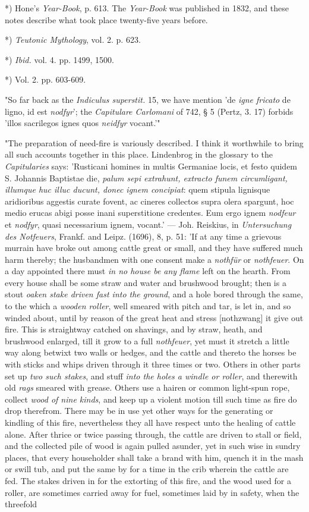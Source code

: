 \documentclass[a4paper, 11pt, oneside, polutonikogreek, english]{article}
\begin{document}
*) Hone's \emph{Year-Book}, p. 613. The \emph{Year-Book} was published in 1832, and these notes describe what took place twenty-five years before.

*) \emph{Teutonic Mythology}, vol. 2. p. 623.

*) \emph{Ibid.} vol. 4. pp. 1499, 1500.

*) Vol. 2. pp. 603-609.

"So far back as the \emph{Indiculus superstit.} 15, we have mention 'de \emph{igne fricato} de ligno, id est \emph{nodfyr}'; the \emph{Capitulare Carlomani} of 742, § 5 (Pertz, 3. 17) forbids 'illos sacrilegos ignes quos \emph{neidfyr} vocant.'"

"The preparation of need-fire is variously described. I think it worthwhile to bring all such accounts together in this place. Lindenbrog in the glossary to the \emph{Capitularies} says: 'Rusticani homines in multis Germaniae locis, et festo quidem S. Johannis Baptistae die, \emph{palum sepi extrahunt, extracto funem circumligant, illumque huc illuc ducunt, donec ignem concipiat}: quem stipula lignisque aridioribus aggestis curate fovent, ac cineres collectos supra olera spargunt, hoc medio erucas abigi posse inani superstitione credentes. Eum ergo ignem \emph{nodfeur} et \emph{nodfyr}, quasi necessarium ignem, vocant.' --- Joh. Reiskius, in \emph{Untersuchung des Notfeuers}, Frankf. and Leipz. (1696), 8, p. 51: 'If at any time a grievous murrain have broke out among cattle great or small, and they have suffered much harm thereby; the husbandmen with one consent make a \emph{nothfür} or \emph{nothfeuer}. On a day appointed there must \emph{in no house be any flame} left on the hearth. From every house shall be some straw and water and brushwood brought; then is a stout \emph{oaken stake driven fast into the ground}, and a hole bored through the same, to the which a \emph{wooden roller}, well smeared with pitch and tar, is let in, and so winded about, until by reason of the great heat and stress [nothzwang] it give out fire. This is straightway catched on shavings, and by straw, heath, and brushwood enlarged, till it grow to a full \emph{nothfeuer}, yet must it stretch a little way along betwixt two walls or hedges, and the cattle and thereto the horses be with sticks and whips driven through it three times or two. Others in other parts set up \emph{two such stakes}, and stuff \emph{into the holes a windle or roller}, and therewith old \emph{rags} smeared with grease. Others use a hairen or common light-spun rope, collect \emph{wood of nine kinds}, and keep up a violent motion till such time as fire do drop therefrom. There may be in use yet other ways for the generating or kindling of this fire, nevertheless they all have respect unto the healing of cattle alone. After thrice or twice passing through, the cattle are driven to stall or field, and the collected pile of wood is again pulled asunder, yet in such wise in sundry places, that every householder shall take a brand with him, quench it in the mash or swill tub, and put the same by for a time in the crib wherein the cattle are fed. The stakes driven in for the extorting of this fire, and the wood used for a roller, are sometimes carried away for fuel, sometimes laid by in safety, when the threefold 
\end{document}
